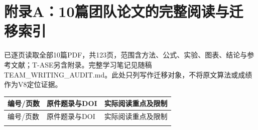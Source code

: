 \clearpage\section{附录A：10篇团队论文的完整阅读与迁移索引}
已逐页读取全部10篇PDF，共123页，范围含方法、公式、实验、图表、结论与参考文献；T-ASE另含附录。完整学习笔记见随稿TEAM\_WRITING\_AUDIT.md。此处只列写作迁移对象，不将原文算法或成绩作为V8定位证据。
\begingroup\fontsize{9}{11.5}\selectfont\setlength{\parskip}{1pt}\setlength{\parindent}{0pt}
\begin{longtable}{@{}>{\raggedright\arraybackslash}p{1cm}>{\raggedright\arraybackslash}p{7.0cm}>{\raggedright\arraybackslash}p{7.4cm}@{}}
\toprule
编号/页数 & 原件题录与DOI & 实际阅读重点及限制 \\
\midrule
\endfirsthead
\toprule
编号/页数 & 原件题录与DOI & 实际阅读重点及限制 \\
\midrule
\endhead
\bottomrule
\endfoot


\end{longtable}
